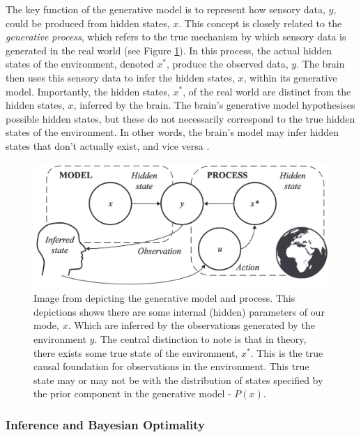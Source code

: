 \documentclass{article}
\begin{document}
The key function of the generative model is to represent how sensory data, $y$, could be produced from hidden states, $x$. This concept is closely related to the \textit{generative process}, which refers to the true mechanism by which sensory data is generated in the real world (see Figure \ref{fig:generative_process}). In this process, the actual hidden states of the environment, denoted $x^*$, produce the observed data, $y$. The brain then uses this sensory data to infer the hidden states, $x$, within its generative model. Importantly, the hidden states, $x^*$, of the real world are distinct from the hidden states, $x$, inferred by the brain. The brain’s generative model hypothesises possible hidden states, but these do not necessarily correspond to the true hidden states of the environment. In other words, the brain’s model may infer hidden states that don’t actually exist, and vice versa \citep{parr2022ActiveInference}.

\begin{figure}[htbp]
    \centering
    \includegraphics[scale=0.6]{images/generative_process.png}
    \caption{Image from \citet{parr2022ActiveInference} depicting the generative model and process. This depictions shows there are some internal (hidden) parameters of our mode, $x$. Which are inferred by the observations generated by the environment $y$. The central distinction to note is that in theory, there exists some true state of the environment, $x^*$. This is the true causal foundation for observations in the environment. This true state may or may not be with the distribution of states specified by the prior component in the generative model - $P(x)$.}
    \label{fig:generative_process} 
\end{figure}

\subsubsection{Inference and Bayesian Optimality}
\end{document}
